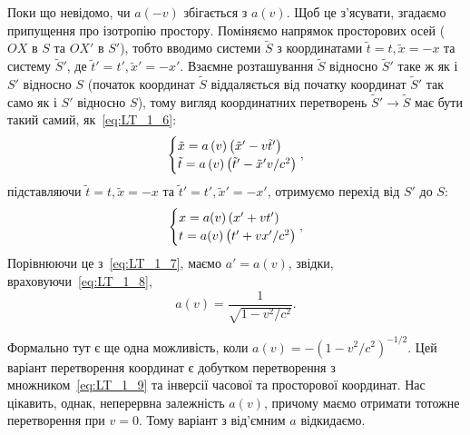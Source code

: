Поки що невідомо, чи $a(-v)$ збігається з $a(v)$. Щоб це з'ясувати, згадаємо припущення про ізотропію простору.
Поміняємо напрямок просторових осей ($OX$ в $S$ та $OX'$ в $S'$), тобто вводимо системи $\tilde{S}$ з координатами
$\tilde{t}=t, \tilde{x}=-x$ та систему $\tilde{S}'$, де $\tilde{t}'=t', \tilde{x}'=-x'$. Взаємне розташування
$\tilde{S}$ відносно $\tilde{S}'$ таке ж як і $S'$ відносно $S$ (початок координат $\tilde{S}$ віддаляється від початку
координат $\tilde{S}'$ так само як і $S'$ відносно $S$), тому вигляд координатних перетворень $\tilde{S}' \to \tilde{S}$
має бути такий самий, як~\eqref{eq:LT_1_6}:
\begin{equation*}
    \begin{cases}
    	\tilde{x}=a\left(v\right)\left(\tilde{x}'-v\tilde{t}'\right) \\
    	\tilde{t}=a\left(v\right)\left(\tilde{t}'-\tilde{x}'v/c^2\right)
    \end{cases}\kern-1em,
\end{equation*}
%
підставляючи $\tilde{t}=t, \tilde{x}=-x$ та $\tilde{t}'=t', \tilde{x}'=-x'$, отримуємо перехід від $S'$ до $S$:
\begin{equation*}
    \begin{cases}
    	x=a(v)\left(x'+vt'\right) \\
    	t=a(v)\left(t'+vx'/c^2\right)
    \end{cases}\kern-1em,
\end{equation*}
Порівнюючи це з~\eqref{eq:LT_1_7}, маємо $a'=a(v)$, звідки, враховуючи~\eqref{eq:LT_1_8},
\begin{equation} \label{eq:LT_1_9}
	a\left(v\right)=\frac{1}{\sqrt{1-v^2/c^2}}.
\end{equation}

Формально тут є ще одна можливість, коли $a\left(v\right)=-(1-v^2/c^2)^{-1/2}$. Цей варіант перетворення координат є
добутком перетворення з множником~\eqref{eq:LT_1_9} та інверсії часової та просторової координат. Нас цікавить, однак,
неперервна залежність $a(v)$, причому маємо отримати тотожне перетворення при $v=0$. Тому варіант з від'ємним $a$
відкидаємо.

